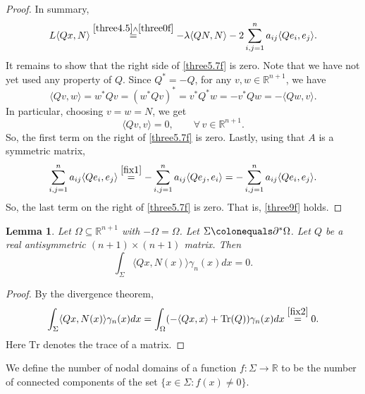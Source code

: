 \documentclass[12pt,reqno]{amsart}
\newtheorem{lemma}[theorem]{Lemma}
\theoremstyle{definition}
\renewcommand{\subset}{\subseteq}
\newcommand{\R}{\mathbb{R}}
\newcommand{\redA}{\partial^{*}\Omega}
\newcommand{\sdimn}{n}
\newcommand{\adimn}{n+1}
\newcommand{\scon}{\lambda}
\begin{document}
\begin{proof}
In summary,
\begin{equation}\label{three5.7f}
L\langle Qx,N\rangle
\stackrel{\eqref{three4.5}\wedge\eqref{three0f}}{=}
-\scon\langle QN,N\rangle
-2\sum_{i,j=1}^{\sdimn}a_{ij}\langle Qe_{i},e_{j}\rangle.
\end{equation}
It remains to show that the right side of \eqref{three5.7f} is zero.  Note that we have not yet used any property of $Q$.  Since $Q^{*}=-Q$, for any $v,w\in\R^{\adimn}$, we have
\begin{equation}\label{fix1}
\langle Qv,w\rangle=w^{*}Qv=(w^{*}Qv)^{*}=v^{*}Q^{*}w=-v^{*}Qw=-\langle Qw,v\rangle.
\end{equation}
In particular, choosing $v=w=N$, we get
\begin{equation}\label{fix2}
\langle Qv,v\rangle=0,\qquad\forall\,v\in\R^{\adimn}.
\end{equation}
So, the first term on the right of \eqref{three5.7f} is zero.  Lastly, using that $A$ is a symmetric matrix,
$$
\sum_{i,j=1}^{\sdimn}a_{ij}\langle Qe_{i},e_{j}\rangle
\stackrel{\eqref{fix1}}{=}-\sum_{i,j=1}^{\sdimn}a_{ij}\langle Qe_{j},e_{i}\rangle
=-\sum_{i,j=1}^{\sdimn}a_{ij}\langle Qe_{i},e_{j}\rangle.
$$
So, the last term on the right of \eqref{three5.7f} is zero.  That is, \eqref{three9f} holds.
\end{proof}

\begin{lemma}\label{lemma94}
Let $\Omega\subset\R^{\adimn}$ with $-\Omega=\Omega$.  Let $\Sigma\colonequals\redA$.  Let $Q$ be a real antisymmetric $(\adimn)\times(\adimn)$ matrix.  Then
$$\int_{\Sigma}\langle Qx,N(x)\rangle\gamma_{\sdimn}(x)dx=0.$$
\end{lemma}
\begin{proof}
By the divergence theorem,
$$\int_{\Sigma}\langle Qx,N(x)\rangle\gamma_{\sdimn}(x)dx=\int_{\Omega}(-\langle Qx,x\rangle+\mathrm{Tr}(Q))\gamma_{\sdimn}(x)dx\stackrel{\eqref{fix2}}{=}0.$$
Here $\mathrm{Tr}$ denotes the trace of a matrix.
\end{proof}

We define the number of nodal domains of a function $f\colon\Sigma\to\R$ to be the number of connected components of the set $\{x\in\Sigma\colon f(x)\neq0\}$.
\end{document}
